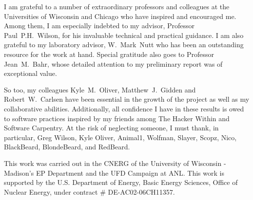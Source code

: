 I am grateful to a number of extraordinary professors and colleagues at the 
Universities of Wisconsin and Chicago who have inspired and encouraged me.  
Among  them, I am especially indebted to my advisor, Professor 
Paul~P.H.~Wilson, for his invaluable technical and practical guidance. I am 
also grateful to my laboratory advisor, W.~Mark~Nutt who has been an 
outstanding resource for the work at hand. Special gratitude also goes to 
Professor Jean~M.~Bahr, whose detailed attention to my preliminary report was of 
exceptional value. 

So too, my colleagues Kyle~M.~Oliver, Matthew~J.~Gidden and Robert~W.~Carlsen 
have been essential in the growth of the \Cyclus project as well as my 
collaborative abilities.  Additionally, all confidence I have in these results 
is owed to software practices inspired by my friends among The Hacker Within 
and Software Carpentry. At the risk of neglecting someone, I must thank, in 
particular, Greg Wilson, Kyle Oliver, Animal1, Wolfman, Slayer, Scopz, Nico,  
BlackBeard, BlondeBeard, and RedBeard.

This work was carried out in the \gls{CNERG} of the University of Wisconsin - 
Madison's \gls{EP} Department and the \gls{UFD} Campaign at \gls{ANL}. This 
work is supported by the U.S. Department of Energy, Basic Energy Sciences, 
Office of Nuclear Energy, under contract \# DE-AC02-06CH11357.
